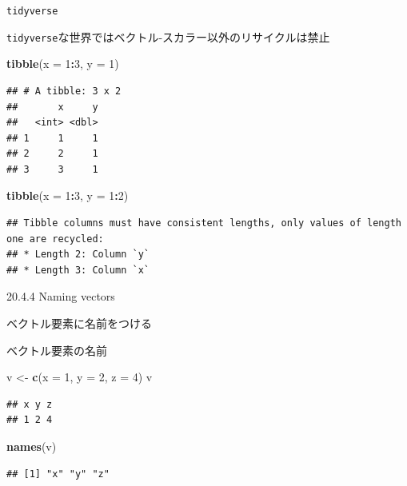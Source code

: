 \documentclass[ignorenonframetext,]{beamer}
\newenvironment{Shaded}{\begin{snugshade}}{\end{snugshade}}
\newcommand{\KeywordTok}[1]{\textcolor[rgb]{0.13,0.29,0.53}{\textbf{#1}}}
\newcommand{\DataTypeTok}[1]{\textcolor[rgb]{0.13,0.29,0.53}{#1}}
\newcommand{\DecValTok}[1]{\textcolor[rgb]{0.00,0.00,0.81}{#1}}
\newcommand{\StringTok}[1]{\textcolor[rgb]{0.31,0.60,0.02}{#1}}
\newcommand{\OperatorTok}[1]{\textcolor[rgb]{0.81,0.36,0.00}{\textbf{#1}}}
\newcommand{\NormalTok}[1]{#1}
\begin{document}
\begin{frame}[fragile]{\texttt{tidyverse}}

\texttt{tidyverse}な世界ではベクトル-スカラー以外のリサイクルは禁止

\begin{Shaded}
\begin{Highlighting}[]
\KeywordTok{tibble}\NormalTok{(}\DataTypeTok{x =} \DecValTok{1}\OperatorTok{:}\DecValTok{3}\NormalTok{, }\DataTypeTok{y =} \DecValTok{1}\NormalTok{)}
\end{Highlighting}
\end{Shaded}

\begin{verbatim}
## # A tibble: 3 x 2
##       x     y
##   <int> <dbl>
## 1     1     1
## 2     2     1
## 3     3     1
\end{verbatim}

\begin{Shaded}
\begin{Highlighting}[]
\KeywordTok{tibble}\NormalTok{(}\DataTypeTok{x =} \DecValTok{1}\OperatorTok{:}\DecValTok{3}\NormalTok{, }\DataTypeTok{y =} \DecValTok{1}\OperatorTok{:}\DecValTok{2}\NormalTok{)}
\end{Highlighting}
\end{Shaded}

\begin{verbatim}
## Tibble columns must have consistent lengths, only values of length one are recycled:
## * Length 2: Column `y`
## * Length 3: Column `x`
\end{verbatim}

\end{frame}

\begin{frame}{20.4.4 Naming vectors}

ベクトル要素に名前をつける

\end{frame}

\begin{frame}[fragile]{ベクトル要素の名前}

\begin{Shaded}
\begin{Highlighting}[]
\NormalTok{v <-}\StringTok{ }\KeywordTok{c}\NormalTok{(}\DataTypeTok{x =} \DecValTok{1}\NormalTok{, }\DataTypeTok{y =} \DecValTok{2}\NormalTok{, }\DataTypeTok{z =} \DecValTok{4}\NormalTok{)}
\NormalTok{v}
\end{Highlighting}
\end{Shaded}

\begin{verbatim}
## x y z 
## 1 2 4
\end{verbatim}

\begin{Shaded}
\begin{Highlighting}[]
\KeywordTok{names}\NormalTok{(v)}
\end{Highlighting}
\end{Shaded}

\begin{verbatim}
## [1] "x" "y" "z"
\end{verbatim}

\end{frame}
\end{document}
